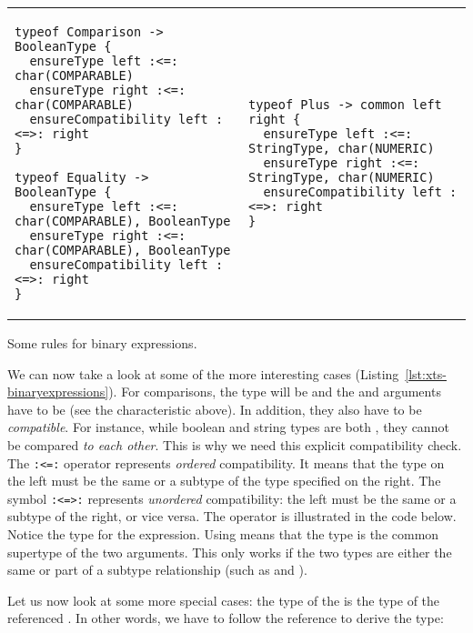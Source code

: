 \begin{listing}[tb]
\begin{tabular}{ll}
\begin{lstlisting}[language=xts,boxpos=t] 
typeof Comparison -> BooleanType {
  ensureType left :<=: char(COMPARABLE)
  ensureType right :<=: char(COMPARABLE)
  ensureCompatibility left :<=>: right
}

typeof Equality -> BooleanType {
  ensureType left :<=: char(COMPARABLE), BooleanType
  ensureType right :<=: char(COMPARABLE), BooleanType
  ensureCompatibility left :<=>: right
}
\end{lstlisting}
&
\begin{lstlisting}[language=xts,boxpos=t] 
typeof Plus -> common left right {
  ensureType left :<=: StringType, char(NUMERIC)
  ensureType right :<=: StringType, char(NUMERIC)
  ensureCompatibility left :<=>: right
} 
\end{lstlisting}
\end{tabular}
\vspace{-3.5ex}
\caption{Some rules for binary expressions.}
\label{lst:xts-binaryexpressions}
\end{listing}

We can now take a look at some of the more interesting cases
(Listing~\ref{lst:xts-binaryexpressions}).
For comparisons, the type will be  and the  and  arguments
have to be  (see the characteristic above). In addition, they
also have to be \emph{compatible}. For instance, while boolean and string types are
both , they cannot be compared \emph{to each other}. This is why
we need this explicit compatibility check.
The \verb|:<=:| operator represents \emph{ordered} compatibility. It means that
the type on the left must be the same or a subtype of the type specified on the
right. The symbol \verb|:<=>:| represents \emph{unordered} compatibility: the
left must be the same or a subtype of the right, or vice versa. The operator is
illustrated in the code below. Notice the type for the  expression.
Using  means that the type is the common supertype of the two
arguments. This only works if the two types are either the same or part of a
subtype relationship (such as  and ).



Let us now look at some more special cases: the type of the 
is the type of the referenced . In other words, we have to follow the 
 reference to derive the type:

